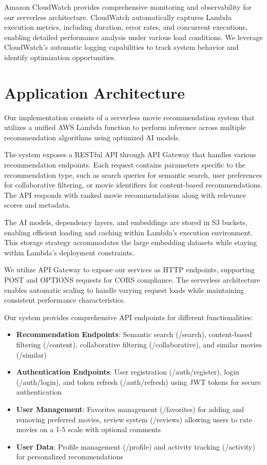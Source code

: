 \documentclass[conference]{IEEEtran}
\begin{document}
Amazon CloudWatch provides comprehensive monitoring and observability for our serverless architecture. CloudWatch automatically captures Lambda execution metrics, including duration, error rates, and concurrent executions, enabling detailed performance analysis under various load conditions. We leverage CloudWatch's automatic logging capabilities to track system behavior and identify optimization opportunities.

\section{Application Architecture}

Our implementation consists of a serverless movie recommendation system that utilizes a unified AWS Lambda function to perform inference across multiple recommendation algorithms using optimized AI models.

The system exposes a RESTful API through API Gateway that handles various recommendation endpoints. Each request contains parameters specific to the recommendation type, such as search queries for semantic search, user preferences for collaborative filtering, or movie identifiers for content-based recommendations. The API responds with ranked movie recommendations along with relevance scores and metadata.

The AI models, dependency layers, and embeddings are stored in S3 buckets, enabling efficient loading and caching within Lambda's execution environment. This storage strategy accommodates the large embedding datasets while staying within Lambda's deployment constraints.

We utilize API Gateway to expose our services as HTTP endpoints, supporting POST and OPTIONS requests for CORS compliance. The serverless architecture enables automatic scaling to handle varying request loads while maintaining consistent performance characteristics.

Our system provides comprehensive API endpoints for different functionalities:

\begin{itemize}
\item \textbf{Recommendation Endpoints}: Semantic search (/search), content-based filtering (/content), collaborative filtering (/collaborative), and similar movies (/similar)
\item \textbf{Authentication Endpoints}: User registration (/auth/register), login (/auth/login), and token refresh (/auth/refresh) using JWT tokens for secure authentication
\item \textbf{User Management}: Favorites management (/favorites) for adding and removing preferred movies, review system (/reviews) allowing users to rate movies on a 1-5 scale with optional comments
\item \textbf{User Data}: Profile management (/profile) and activity tracking (/activity) for personalized recommendations
\end{itemize}
\end{document}
